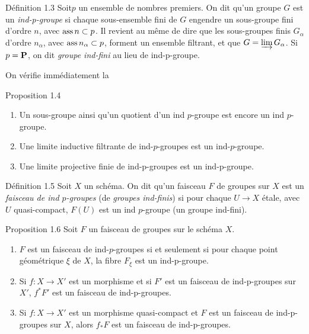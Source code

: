 \documentclass[10pt]{../fichiers-configuration-latex/smfart}
\begin{document}
\begin{enonce*}{Définition 1.3}
Soit\pageoriginale $p$ un ensemble de nombres premiers. On dit qu'un
groupe $G$ est un \emph{ind-p-groupe} si chaque sous-ensemble fini de $G$
engendre un sous-groupe fini d'ordre $n$, avec $\operatorname{ass} n\subset p$. Il
revient au même de dire que les sous-groupes finis $G_{\alpha}$
d'ordre $n_{\alpha}$, avec $\operatorname{ass} n_{\alpha}\subset p$, forment un
ensemble filtrant, et que $G=\varinjlim G_{\alpha}$. Si
$p=\mathbf{P}$, on dit \emph{groupe ind-fini} au lieu de ind-p-groupe.
\end{enonce*}

On vérifie immédiatement la
\begin{enonce*}{Proposition 1.4}
\begin{enumerate}
\renewcommand{\theenumi}{\roman{enumi}}
\renewcommand{\labelenumi}{(\theenumi)}
\item Un sous-groupe ainsi qu'un quotient d'un ind $p$-groupe est
  encore un ind $p$-groupe.

\item Une limite inductive filtrante de ind-$p$-groupes est un
  ind-$p$-groupe.

\item Une limite projective finie de ind-p-groupes est un ind-p-groupe.
\end{enumerate}
\end{enonce*}

\begin{enonce*}{Définition 1.5}
Soit $X$ un schéma. On dit qu'un faisceau $F$ de groupes sur $X$ est
un \emph{faisceau de ind $p$-groupes} (\resp de \emph{groupes
  ind-finis})
si pour chaque $U\rightarrow X$ étale, avec $U$ quasi-compact, $F(U)$ est un
ind $p$-groupe (\resp un groupe ind-fini).
\end{enonce*}

\begin{enonce*}{Proposition 1.6}
Soit $F$ un faisceau de groupes sur le schéma $X$.
\begin{enumerate}
\renewcommand{\theenumi}{\roman{enumi}}
\renewcommand{\labelenumi}{(\theenumi)}
\item $F$ est un faisceau de ind-$p$-groupes si et seulement si pour
  chaque point géométrique $\xi$ de $X$, la fibre $F_{\xi}$ est un
  ind-p-groupe.

\item Si $f:X\rightarrow X'$ est un morphisme et si $F'$ est un
  faisceau de ind-p-groupes sur $X'$, $f^{\ast}F'$ est un faisceau de
  ind-p-groupes.

\item Si $f:X\rightarrow X'$ est un morphisme quasi-compact et $F$ est
  un faisceau de ind-p-groupes sur $X$, alors $f_{\ast}F$ est un
  faisceau de ind-p-groupes.
\end{enumerate}
\end{enonce*}
\end{document}
